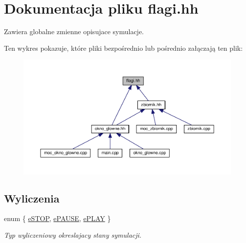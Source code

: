 \hypertarget{flagi_8hh}{\section{Dokumentacja pliku flagi.\-hh}
\label{flagi_8hh}
}


Zawiera globalne zmienne opisujace symulacje.  


Ten wykres pokazuje, które pliki bezpośrednio lub pośrednio załączają ten plik\-:\nopagebreak
\begin{figure}[H]
\begin{center}
\leavevmode
\includegraphics[width=350pt]{flagi_8hh__dep__incl}
\end{center}
\end{figure}
\subsection*{Wyliczenia}
\begin{DoxyCompactItemize}
\item 
enum \{ \hyperlink{flagi_8hh_a06fc87d81c62e9abb8790b6e5713c55ba4957581ee0386c284fd318121e335af6}{e\-S\-T\-O\-P}, 
\hyperlink{flagi_8hh_a06fc87d81c62e9abb8790b6e5713c55ba6a2f69efc37338427ecd0db296923a79}{e\-P\-A\-U\-S\-E}, 
\hyperlink{flagi_8hh_a06fc87d81c62e9abb8790b6e5713c55baecdbae639704e0b7e4b5478734e45b8d}{e\-P\-L\-A\-Y}
 \}
\begin{DoxyCompactList}\small\item\em Typ wyliczeniowy okreslajacy stany symulacji. \end{DoxyCompactList}\end{DoxyCompactItemize}
